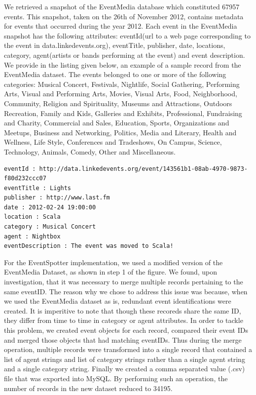 \documentclass[a4paper,11pt]{report}
\begin{document}
We retrieved a snapshot of the EventMedia database which constituted 67957 events. This snapshot, taken on the 26th of November 2012, contains metadata for events that occurred during the year 2012. Each event in the EventMedia snapshot has the following attributes: eventId(url to a web page corresponding to the event in data.linkedevents.org), eventTitle, publisher, date, locations, category, agent(artists or bands performing at the event) and event description. We provide in the listing given below, an example of a sample record from the EventMedia dataset. The events belonged to one or more of the following categories: Musical Concert, Festivals, Nightlife, Social Gathering, Performing Arts, Visual and Performing Arts, Movies, Visual Arts, Food, Neighborhood, Community, Religion and Spirituality, Museums and Attractions, Outdoors Recreation, Family and Kids, Galleries and Exhibits, Professional, Fundraising and Charity, Commercial and Sales, Education, Sports, Organizations and Meetups, Business and Networking, Politics, Media and Literary, Health and Wellness, Life Style, Conferences and Tradeshows, On Campus, Science, Technology, Animals, Comedy, Other and Miscellaneous. \newline 

\begin{lstlisting}[caption = This listing shows an example of a sample record from the EventMedia dataset.]
eventId : http://data.linkedevents.org/event/143561b1-08ab-4970-9873-f80d232ccc07
eventTitle : Lights
publisher : http://www.last.fm
date : 2012-02-24 19:00:00
location : Scala
category : Musical Concert
agent : Nightbox
eventDescription : The event was moved to Scala!
\end{lstlisting}

For the EventSpotter implementation, we used a modified version of the EventMedia Dataset, as shown in step 1 of the figure. We found, upon investigation, that it was necessary to merge multiple records pertaining to the same eventID. The reason why we chose to address this issue was because, when we used the EventMedia dataset as is, redundant event identifications were created. It is imperitive to note that though these recoreds share the same ID, they differ from time to time in category or agent attributes. In order to tackle this problem, we created event objects for each record, compared their event IDs and merged those objects that had matching eventIDs. Thus during the merge operation, multiple records were transformed into a single record that contained a list of agent strings and list of category strings rather than a single agent string and a single category string. Finally we created a comma separated value (.csv) file that was exported into MySQL. By performing such an operation, the number of records in the new dataset reduced to 34195.   
 
\end{document}

